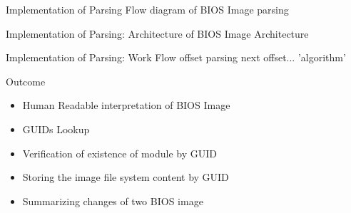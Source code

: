 \begin{frame}{Implementation of Parsing}
	Flow diagram of BIOS Image parsing
\end{frame} 

\begin{frame}{Implementation of Parsing: Architecture of BIOS Image}
	Architecture
\end{frame}

\begin{frame}{Implementation of Parsing: Work Flow}
	offset parsing
	next offset... 'algorithm'
\end{frame}

\begin{frame}{Outcome}
	\begin{itemize}
		\item Human Readable interpretation of BIOS Image
		\item GUIDs Lookup
		\item Verification of existence of module by GUID
		\item Storing the image file system content by GUID
		\item Summarizing changes of two BIOS image
	\end{itemize}
\end{frame}